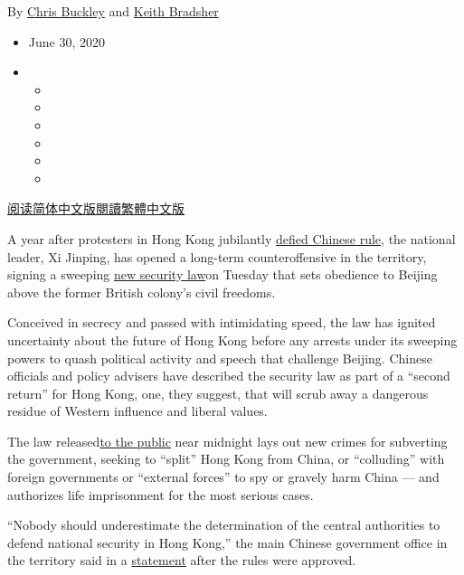 By \href{https://www.nytimes3xbfgragh.onion/by/chris-buckley}{Chris
Buckley} and
\href{https://www.nytimes3xbfgragh.onion/by/keith-bradsher}{Keith
Bradsher}

\begin{itemize}
\item
  June 30, 2020
\item
  \begin{itemize}
  \item
  \item
  \item
  \item
  \item
  \item
  \end{itemize}
\end{itemize}

\href{https://cn.nytimes3xbfgragh.onion/china/20200701/china-critics-security-law-hong-kong/}{阅读简体中文版}\href{https://cn.nytimes3xbfgragh.onion/china/20200701/china-critics-security-law-hong-kong/zh-ha}{閱讀繁體中文版}

A year after protesters in Hong Kong jubilantly
\href{https://www.nytimes3xbfgragh.onion/2019/07/01/world/asia/china-hong-kong-protest.html}{defied
Chinese rule}, the national leader, Xi Jinping, has opened a long-term
counteroffensive in the territory, signing a sweeping
\href{https://www.nytimes3xbfgragh.onion/2020/06/29/world/asia/china-hong-kong-security-law-rules.html}{new
security law}on Tuesday that sets obedience to Beijing above the former
British colony's civil freedoms.

Conceived in secrecy and passed with intimidating speed, the law has
ignited uncertainty about the future of Hong Kong before any arrests
under its sweeping powers to quash political activity and speech that
challenge Beijing. Chinese officials and policy advisers have described
the security law as part of a ``second return'' for Hong Kong, one, they
suggest, that will scrub away a dangerous residue of Western influence
and liberal values.

The law
released\href{https://www.gld.gov.hk/egazette/pdf/20202444e/es220202444136.pdf}{to
the public} near midnight lays out new crimes for subverting the
government, seeking to ``split'' Hong Kong from China, or ``colluding''
with foreign governments or ``external forces'' to spy or gravely harm
China --- and authorizes life imprisonment for the most serious cases.

``Nobody should underestimate the determination of the central
authorities to defend national security in Hong Kong,'' the main Chinese
government office in the territory said in a
\href{http://hm.people.com.cn/n1/2020/0630/c42272-31765400.html}{statement}
after the rules were approved.

